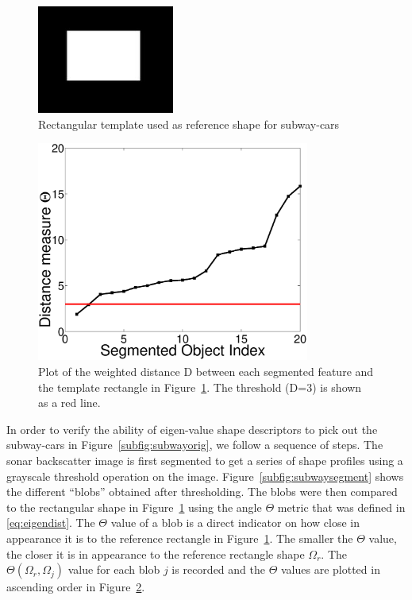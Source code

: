\documentclass {udthesis}
\begin{document}
\begin{figure}
    \centering      
    \includegraphics[width=0.4\textwidth]{eigenrect}
    \caption[Rectangular template used as reference shape for subway-cars]{Rectangular template used as reference shape for subway-cars}
    \label{subfig:subwayrect}
\end{figure}
%
\begin{figure}
    \centering
    \includegraphics[width=0.8\textwidth]{subway_dot_prod}
    \caption[Plot of similarity measures of different underwater objects to the subway car reference profile]{Plot of the weighted distance D between each segmented feature and the template rectangle in Figure~\ref{subfig:subwayrect}. The threshold (D=3) is shown as a red line.}
    \label{subfig:eigendistances}
\end{figure}

In order to verify the ability of eigen-value shape descriptors to pick out the subway-cars in Figure~\ref{subfig:subwayorig}, we follow a sequence of steps. The sonar backscatter image is first segmented to get a series of shape profiles using a grayscale threshold operation on the image. Figure~\ref{subfig:subwaysegment} shows the different ``blobs'' obtained after thresholding. The blobs were then compared to the rectangular shape in Figure~\ref{subfig:subwayrect} using the angle $\Theta$ metric that was defined in \eqref{eq:eigendist}. The $\Theta$ value of a blob is a direct indicator on how close in appearance it is to the reference rectangle in Figure~\ref{subfig:subwayrect}. The smaller the $\Theta$ value, the closer it is in appearance to the reference rectangle shape $\Omega_r$. The $\Theta(\Omega_r,\Omega_j)$ value for each blob $j$ is recorded and the $\Theta$ values are plotted in ascending order in Figure~\ref{subfig:eigendistances}. 
\end{document}

